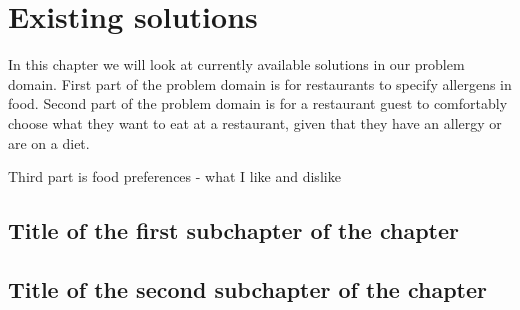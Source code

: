 \chapter{Existing solutions}
In this chapter we will look at currently available solutions in our problem domain. 
First part of the problem domain is for restaurants to specify allergens in food.
Second part of the problem domain is for a restaurant guest to comfortably choose what they want to eat at a restaurant, given that they have an allergy or are on a diet.

Third part is 
food preferences - what I like and dislike

\section{Title of the first subchapter of the chapter}

\section{Title of the second subchapter of the chapter}
